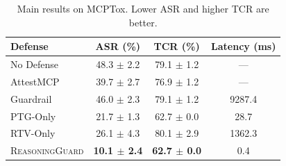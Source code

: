 \begin{table}[t]
\centering
\small
\begin{tabular}{lccc}
\toprule
Defense & ASR (\%) & TCR (\%) & Latency (ms) \\
\midrule
No Defense & 48.3 $\pm$ 2.2 & 79.1 $\pm$ 1.2 & --- \\
AttestMCP & 39.7 $\pm$ 2.7 & 76.9 $\pm$ 1.2 & --- \\
Guardrail & 46.0 $\pm$ 2.3 & 79.1 $\pm$ 1.2 & 9287.4 \\
PTG-Only & 21.7 $\pm$ 1.3 & 62.7 $\pm$ 0.0 & 28.7 \\
RTV-Only & 26.1 $\pm$ 4.3 & 80.1 $\pm$ 2.9 & 1362.3 \\
\textsc{ReasoningGuard} & \textbf{10.1 $\pm$ 2.4} & \textbf{62.7 $\pm$ 0.0} & 0.4 \\
\bottomrule
\end{tabular}
\caption{Main results on MCPTox. Lower ASR and higher TCR are better.}
\label{tab:main}
\end{table}
